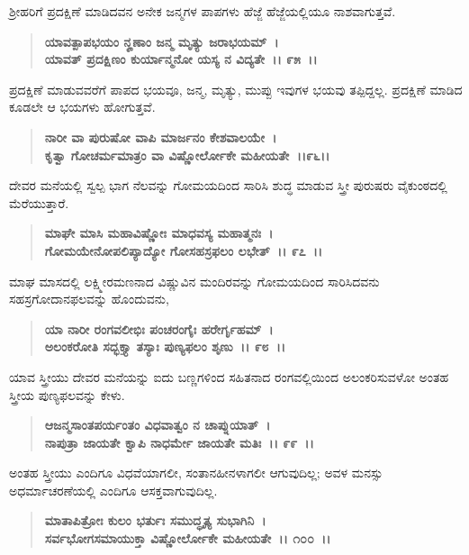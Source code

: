 ಶ‍್ರೀಹರಿಗೆ ಪ್ರದಕ್ಷಿಣೆ ಮಾಡಿದವನ ಅನೇಕ ಜನ್ಮಗಳ ಪಾಪಗಳು ಹೆಜ್ಜೆ ಹೆಜ್ಜೆಯಲ್ಲಿಯೂ ನಾಶವಾಗುತ್ತವೆ.

\begin{verse}
\textbf{ಯಾವತ್ಪಾಪಭಯಂ ನೄಣಾಂ ಜನ್ಮ ಮೃತ್ಯು ಜರಾಭಯಮ್~।}\\\textbf{ಯಾವತ್ ಪ್ರದಕ್ಷಿಣಂ ಕುರ್ಯಾನ್ಮನೋ ಯಸ್ಯ ನ ವಿದ್ಯತೇ~।। ೯೫~।।}
\end{verse}

ಪ್ರದಕ್ಷಿಣೆ ಮಾಡುವವರೆಗೆ ಪಾಪದ ಭಯವೂ, ಜನ್ಮ, ಮೃತ್ಯು, ಮುಪ್ಪು ಇವುಗಳ ಭಯವು ತಪ್ಪಿದ್ದಲ್ಲ. ಪ್ರದಕ್ಷಿಣೆ ಮಾಡಿದ ಕೂಡಲೇ ಆ ಭಯಗಳು ಹೋಗುತ್ತವೆ.

\begin{verse}
\textbf{ನಾರೀ ವಾ ಪುರುಷೋ ವಾಪಿ ಮಾರ್ಜನಂ ಕೇಶವಾಲಯೇ~।}\\\textbf{ಕೃತ್ವಾ ಗೋಚರ್ಮಮಾತ್ರಂ ವಾ ವಿಷ್ಣೋರ್ಲೋಕೇ ಮಹೀಯತೇ~।।೯೬।।}
\end{verse}

ದೇವರ ಮನೆಯಲ್ಲಿ ಸ್ವಲ್ಪ ಭಾಗ ನೆಲವನ್ನು ಗೋಮಯದಿಂದ ಸಾರಿಸಿ ಶುದ್ಧ ಮಾಡುವ ಸ್ತ್ರೀ ಪುರುಷರು ವೈಕುಂಠದಲ್ಲಿ ಮೆರೆಯುತ್ತಾರೆ.

\begin{verse}
\textbf{ಮಾಘೇ ಮಾಸಿ ಮಹಾವಿಷ್ಣೋಃ ಮಾಧವಸ್ಯ ಮಹಾತ್ಮನಃ~।}\\\textbf{ಗೋಮಯೇನೋಪಲಿಪ್ಯಾದ್ಯೋ ಗೋಸಹಸ್ರಫಲಂ ಲಭೇತ್~।। ೯೭~।।}
\end{verse}

ಮಾಘ ಮಾಸದಲ್ಲಿ ಲಕ್ಷ್ಮೀರಮಣನಾದ ವಿಷ್ಣುವಿನ ಮಂದಿರವನ್ನು ಗೋಮಯದಿಂದ ಸಾರಿಸಿದವನು ಸಹಸ್ರಗೋದಾನಫಲವನ್ನು ಹೊಂದುವನು,

\begin{verse}
\textbf{ಯಾ ನಾರೀ ರಂಗವಲೀಭಿಃ ಪಂಚರಂಗೈಃ ಹರೇರ್ಗೃಹಮ್~।}\\\textbf{ಅಲಂಕರೋತಿ ಸದ್ಭಕ್ತ್ಯಾ ತಸ್ಯಾಃ ಪುಣ್ಯಫಲಂ ಶೃಣು~।। ೯೮~।।}
\end{verse}

ಯಾವ ಸ್ತ್ರೀಯು ದೇವರ ಮನೆಯನ್ನು ಐದು ಬಣ್ಣಗಳಿಂದ ಸಹಿತನಾದ ರಂಗವಲ್ಲಿಯಿಂದ ಅಲಂಕರಿಸುವಳೋ ಅಂತಹ ಸ್ತ್ರೀಯ ಪುಣ್ಯಫಲವನ್ನು ಕೇಳು.

\begin{verse}
\textbf{ಆಜನ್ಮಸಾಂತಪರ್ಯಂತಂ ವಿಧವಾತ್ವಂ ನ ಚಾಪ್ನುಯಾತ್~।}\\\textbf{ನಾಪುತ್ರಾ ಜಾಯತೇ ಕ್ವಾಪಿ ನಾಧರ್ಮೇ ಜಾಯತೇ ಮತಿಃ~।। ೯೯~।।}
\end{verse}

ಅಂತಹ ಸ್ತ್ರೀಯು ಎಂದಿಗೂ ವಿಧವೆಯಾಗಲೀ, ಸಂತಾನಹೀನಳಾಗಲೀ ಆಗುವುದಿಲ್ಲ; ಅವಳ ಮನಸ್ಸು ಅಧರ್ಮಾಚರಣೆಯಲ್ಲಿ ಎಂದಿಗೂ ಆಸಕ್ತವಾಗುವುದಿಲ್ಲ.

\begin{verse}
\textbf{ಮಾತಾಪಿತ್ರೋಃ ಕುಲಂ ಭರ್ತುಃ ಸಮುದ್ಧೃತ್ಯ ಸುಭಾಗಿನಿ~।}\\\textbf{ಸರ್ವಭೋಗಸಮಾಯುಕ್ತಾ ವಿಷ್ಣೋರ್ಲೋಕೇ ಮಹೀಯತೇ~।। ೧೦೦~।।}
\end{verse}

